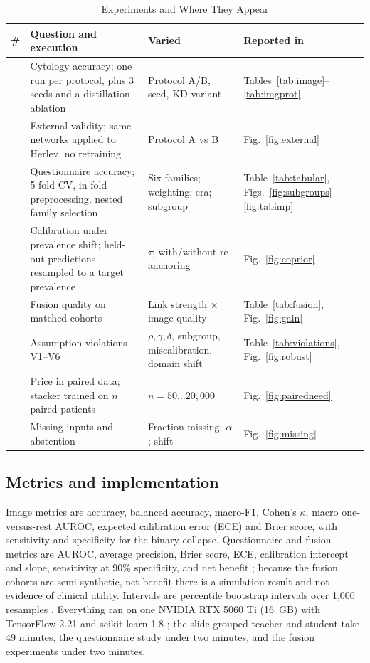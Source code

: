 \documentclass[lettersize,journal]{IEEEtran}
\begin{document}
\begin{table}[t]
\caption{Experiments and Where They Appear}
\label{tab:experiments}
\centering\footnotesize
\setlength{\tabcolsep}{3pt}
\begin{tabular}{@{}>{\raggedright\arraybackslash}p{}>{\raggedright\arraybackslash}p{}>{\raggedright\arraybackslash}p{}>{\raggedright\arraybackslash}p{}@{}}
\toprule
\# & Question and execution & Varied & Reported in \\
\midrule
1 & Cytology accuracy; one run per protocol, plus 3 seeds and a distillation ablation & Protocol A/B, seed, KD variant & Tables~\ref{tab:image}--\ref{tab:imgprot} \\
2 & External validity; same networks applied to Herlev, no retraining & Protocol A vs B & Fig.~\ref{fig:external} \\
3 & Questionnaire accuracy; 5-fold CV, in-fold preprocessing, nested family selection & Six families; weighting; era; subgroup & Table~\ref{tab:tabular}, Figs.~\ref{fig:subgroups}--\ref{fig:tabimp} \\
4 & Calibration under prevalence shift; held-out predictions resampled to a target prevalence & $\tau$; with/without re-anchoring & Fig.~\ref{fig:coprior} \\
5 & Fusion quality on matched cohorts & Link strength $\times$ image quality & Table~\ref{tab:fusion}, Fig.~\ref{fig:gain} \\
6 & Assumption violations V1--V6 & $\rho,\gamma,\delta$, subgroup, miscalibration, domain shift & Table~\ref{tab:violations}, Fig.~\ref{fig:robust} \\
7 & Price in paired data; stacker trained on $n$ paired patients & $n=50\ldots20{,}000$ & Fig.~\ref{fig:pairedneed} \\
8 & Missing inputs and abstention & Fraction missing; $\alpha$; shift & Fig.~\ref{fig:missing} \\
\bottomrule
\end{tabular}
\end{table}

\subsection{Metrics and implementation}
Image metrics are accuracy, balanced accuracy, macro-F1, Cohen's $\kappa$, macro one-versus-rest AUROC, expected calibration error (ECE) \cite{guo2017calibration} and Brier score, with sensitivity and specificity for the binary collapse. Questionnaire and fusion metrics are AUROC, average precision, Brier score, ECE, calibration intercept and slope, sensitivity at 90\% specificity, and net benefit \cite{vickers2006decision}; because the fusion cohorts are semi-synthetic, net benefit there is a simulation result and not evidence of clinical utility. Intervals are percentile bootstrap intervals over 1,000 resamples \cite{efron1994bootstrap}. Everything ran on one NVIDIA RTX 5060 Ti (16~GB) with TensorFlow 2.21 and scikit-learn 1.8 \cite{pedregosa2011scikit}; the slide-grouped teacher and student take 49 minutes, the questionnaire study under two minutes, and the fusion experiments under two minutes.
\end{document}
